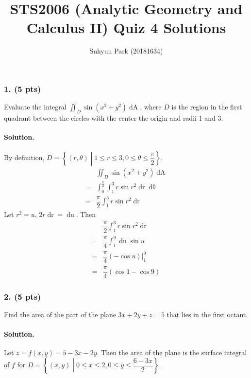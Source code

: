 \documentclass[runningheads]{llncs}
\begin{document}
\title{STS2006 (Analytic Geometry and Calculus II) \newline Quiz 4 Solutions}
\author{Suhyun Park (20181634)}
\maketitle

\subsubsection{1. (5 pts)} Evaluate the integral $\iint_D \sin\left(x^2+y^2\right)\mathop{dA}$, where $D$ is the region in the first quadrant between the circles with the center the origin and radii 1 and 3.

\paragraph{Solution.} By definition, $D=\left\{\left(r, \theta\right)\middle| 1\leq r \leq3, 0\leq\theta\leq\dfrac{\pi}{2}\right\}$.
\begin{align*}
	& \iint_D \sin\left(x^2+y^2\right)\mathop{dA}\\
	=& \int^{\frac{\pi}{2}}_{0} \int^{3}_{1} r \sin r^2 \mathop{dr} \mathop{d\theta}\\
	=& \dfrac{\pi}{2} \int^{3}_{1} r \sin r^2 \mathop{dr}
\end{align*}
Let $r^2=u$, $2r\mathop{dr}=\mathop{du}$. Then
\begin{align*}
	& \dfrac{\pi}{2} \int^{3}_{1} r \sin r^2 \mathop{dr}\\
	=& \dfrac{\pi}{4} \int^{9}_{1}  \mathop{du} \sin u\\
	=& \dfrac{\pi}{4} \left.\left(-\cos u\right)\right|^9_1\\
	=& \dfrac{\pi}{4} \left(\cos 1 - \cos 9\right)
\end{align*}
\par

\subsubsection{2. (5 pts)} Find the area of the part of the plane $3x+2y+z=5$ that lies in the first octant.

\paragraph{Solution.} Let $z=f\left(x, y\right)=5-3x-2y$. Then the area of the plane is the surface integral of $f$ for $D=\left\{\left(x, y\right)\middle| 0\leq x \leq2, 0\leq y \leq\dfrac{6-3x}{2}\right\}$.
\end{document}
